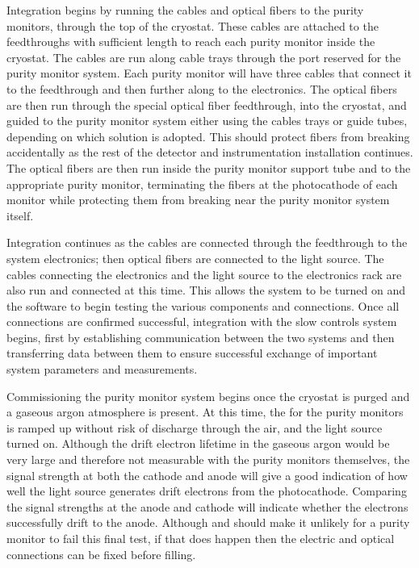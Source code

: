 Integration %
begins by running the   cables and optical fibers to the purity monitors, through the top of the cryostat.  These cables %
are attached to the    feedthroughs with sufficient length to reach each purity monitor inside the cryostat.  
The cables %
are run along cable trays through the port reserved for the purity monitor system. 
Each purity monitor will have three   cables that connect it to the feedthrough and then further along to the   electronics.  The optical fibers %
are then run through the special optical fiber feedthrough, into the cryostat, and %
guided to the purity monitor system either using the cables trays or guide tubes, depending on which solution is adopted. 
This should protect fibers from breaking accidentally as the rest of the detector and instrumentation installation continues.  The optical fibers %
are then run inside the purity monitor support tube and to the appropriate purity monitor, terminating the fibers at the photocathode of each monitor while protecting them from breaking near the purity monitor system itself.

Integration %
continues as the   cables are connected through the feedthrough to the system   electronics; then optical fibers are connected to the light source.  The cables connecting the  electronics and the light source to the electronics rack %
are also run and connected at this time.  This allows the system to be turned on and the software to begin testing the various components and connections.  Once all connections are confirmed successful, integration with the slow controls system begins, first by establishing communication between the two systems and then transferring data between them to ensure successful exchange of important system parameters and measurements.  

Commissioning the purity monitor system %
begins once the cryostat is purged and a gaseous argon atmosphere is present.  At this time, the  for the purity monitors %
  is ramped up without risk of discharge through the air, and the light source turned on.  Although the drift electron lifetime in the gaseous argon would be very large and therefore not %
  measurable with the purity monitors themselves, the signal strength at both the cathode and anode will %
  give a good indication of how well the light source generates drift electrons from the photocathode.  Comparing the signal strengths at the anode and cathode will indicate whether the electrons successfully drift to the anode.
  Although  and  should make it unlikely for a purity monitor to fail this final test, if that does happen then the electric and optical connections can be fixed before filling.

